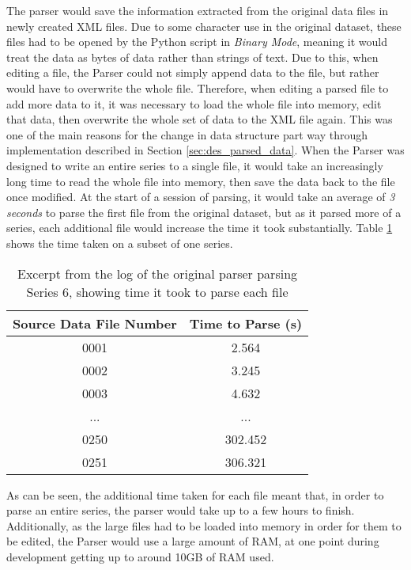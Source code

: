 The parser would save the information extracted from the original data files in newly created XML files. Due to some character use in the original dataset, these files had to be opened by the Python script in \emph{Binary Mode}, meaning it would treat the data as bytes of data rather than strings of text. Due to this, when editing a file, the Parser could not simply append data to the file, but rather would have to overwrite the whole file. Therefore, when editing a parsed file to add more data to it, it was necessary to load the whole file into memory, edit that data, then overwrite the whole set of data to the XML file again.
This was one of the main reasons for the change in data structure part way through implementation described in Section \ref{sec:des_parsed_data}. When the Parser was designed to write an entire series to a single file, it would take an increasingly long time to read the whole file into memory, then save the data back to the file once modified. At the start of a session of parsing, it would take an average of \emph{3 seconds} to parse the first file from the original dataset, but as it parsed more of a series, each additional file would increase the time it took substantially. Table \ref{tbl:original_parse_time} shows the time taken on a subset of one series.

\begin{table}[ht!]
\centering
\begin{tabular}{c | c}
	\textbf{Source Data File Number} & \textbf{Time to Parse (s)} \\
	\hline
	0001 & 2.564   \\
	0002 & 3.245   \\
	0003 & 4.632   \\
	...  & ...     \\
	0250 & 302.452 \\
	0251 & 306.321 \\

\end{tabular}
\caption{Excerpt from the log of the original parser parsing Series 6, showing time it took to parse each file}
\label{tbl:original_parse_time}
\end{table}

As can be seen, the additional time taken for each file meant that, in order to parse an entire series, the parser would take up to a few hours to finish. Additionally, as the large files had to be loaded into memory in order for them to be edited, the Parser would use a large amount of RAM, at one point during development getting up to around 10GB of RAM used.

